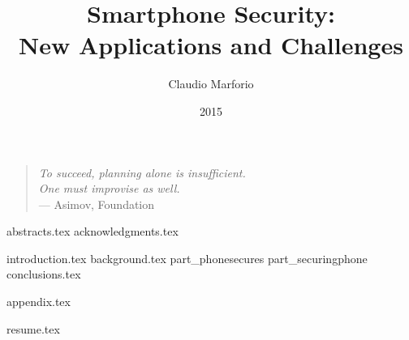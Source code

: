\documentclass{ETHdissertation}
\title{Smartphone Security:\\ New Applications and Challenges}
\author{Claudio Marforio}
\date{2015}
\begin{document}
\newsavebox{\myimage}

\frontmatter
\maketitle
\cleardoublepage
\thispagestyle{empty}
 \vspace*{\fill} 
\begin{quote} 
\raggedleft
\textit{To succeed, planning alone is insufficient.\\ One must improvise as well.} \\
--- Asimov, Foundation
\end{quote}
\vspace*{\fill}
\cleardoublepage
{}
{abstracts.tex}
{acknowledgments.tex}
\setcounter{tocdepth}{1}
\tableofcontents
\listoffigures
\listoftables

\mainmatter
{introduction.tex}
{background.tex}
{part_phonesecures}
{part_securingphone}
{conclusions.tex}

\backmatter
{appendix.tex}

\clearpage
{}



\clearpage
\clearpage
{}
{resume.tex}
\cleardoublepage
\end{document}
